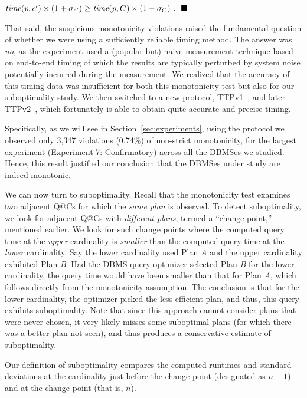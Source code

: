 \documentclass[prodmode,acmtods]{acmsmall}
\makeatletter
\def\QatC{Q{@}C}
\makeatother
\begin{document}
\quad\quad\quad\quad\quad$\hbox{\em time} (p, c^{\prime}) \times (1+\sigma_{c^{\prime}}) \geq
\hbox{\em time} (p,C) \times (1-\sigma_{C})~.~~\hfill\blacksquare$

\vspace{1em}
That said, the suspicious monotonicity violations raised the fundamental question of whether
we were using a sufficiently reliable timing method. The answer was {\em no}, as
the experiment used a (popular but) naive measurement technique 
based on end-to-end timing of which the results are 
typically perturbed by system noise potentially incurred during the measurement. 
We realized that the accuracy of this timing data was
insufficient for both this monotonicity test but also for our suboptimality study. 
We then switched to a new protocol, TTPv1~\cite{TTPv1}, and later TTPv2~\cite{TTPv2},
which fortunately is able to obtain quite accurate and precise timing.

Specifically, as we will see in Section~\ref{sec:experiments}, 
using the protocol we observed only 3,347 violations (0.74\%) of non-strict monotonicity, 
for the largest experiment (Experiment 7: Confirmatory) across all
the \hbox{DBMSes} we studied. 
Hence, this result justified our conclusion that the \hbox{DBMSes} under
study are indeed monotonic.

We can now turn to suboptimality. Recall that the monotonicity test examines
two adjacent {\QatC}s for which the {\em same plan} is observed. To detect
suboptimality, we look for adjacent {\QatC}s with {\em different plans}, termed
a ``change point,'' mentioned earlier. We look for such change points where the computed
query time at the {\em upper} cardinality is {\em smaller} than the computed
query time at the {\em lower} cardinality. Say the lower cardinality used
Plan {\em A} and the upper cardinality exhibited Plan {\em B}. Had the \hbox{DBMS}
query optimizer selected Plan {\em B} for the lower cardinality, the query time would have been smaller than that for
Plan {\em A}, which follows directly from the
monotonicity assumption. The conclusion is that for the lower cardinality, the
optimizer picked the less efficient plan, and thus, this query exhibits
\hbox{suboptimality}. Note that since this approach cannot consider plans
that were never chosen, it very likely misses some suboptimal plans (for
which there was a better plan not seen), and thus produces a
conservative estimate of suboptimality.

Our definition of suboptimality compares the computed runtimes 
and standard deviations at the cardinality just before the change
point (designated as $n-1$) and at the change point (that is, $n$).
\end{document}

